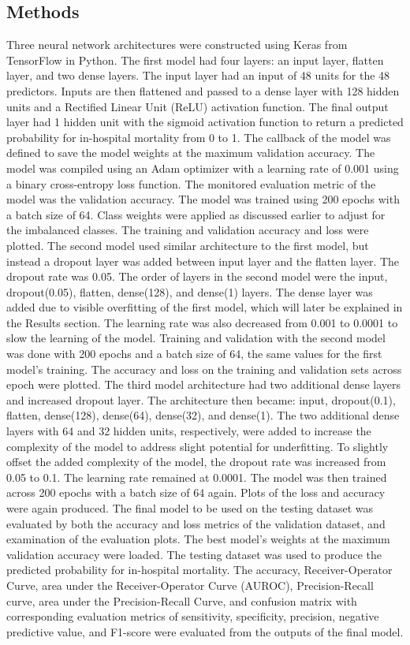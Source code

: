 \documentclass[10pt]{article}
\begin{document}
\begin{multicols}{2}
\section{Methods}
Three neural network architectures were constructed using Keras from TensorFlow in Python. The first model had four layers: an input layer, flatten layer, and two dense layers. The input layer had an input of 48 units for the 48 predictors. Inputs are then flattened and passed to a dense layer with 128 hidden units and a Rectified Linear Unit (ReLU) activation function. The final output layer had 1 hidden unit with the sigmoid activation function to return a predicted probability for in-hospital mortality from 0 to 1. The callback of the model was defined to save the model weights at the maximum validation accuracy. The model was compiled using an Adam optimizer with a learning rate of 0.001 using a binary cross-entropy loss function. The monitored evaluation metric of the model was the validation accuracy. The model was trained using 200 epochs with a batch size of 64. Class weights were applied as discussed earlier to adjust for the imbalanced classes. The training and validation accuracy and loss were plotted. The second model used similar architecture to the first model, but instead a dropout layer was added between input layer and the flatten layer. The dropout rate was 0.05. The order of layers in the second model were the input, dropout(0.05), flatten, dense(128), and dense(1) layers. The dense layer was added due to visible overfitting of the first model, which will later be explained in the Results section. The learning rate was also decreased from 0.001 to 0.0001 to slow the learning of the model. Training and validation with the second model was done with 200 epochs and a batch size of 64, the same values for the first model's training. The accuracy and loss on the training and validation sets across epoch were plotted. The third model architecture had two additional dense layers and increased dropout layer. The architecture then became: input, dropout(0.1), flatten, dense(128), dense(64), dense(32), and dense(1). The two additional dense layers with 64 and 32 hidden units, respectively, were added to increase the complexity of the model to address slight potential for underfitting. To slightly offset the added complexity of the model, the dropout rate was increased from 0.05 to 0.1. The learning rate remained at 0.0001. The model was then trained across 200 epochs with a batch size of 64 again. Plots of the loss and accuracy were again produced. The final model to be used on the testing dataset was evaluated by both the accuracy and loss metrics of the validation dataset, and examination of the evaluation plots. The best model's weights at the maximum validation accuracy were loaded. The testing dataset was used to produce the predicted probability for in-hospital mortality. The accuracy, Receiver-Operator Curve, area under the Receiver-Operator Curve (AUROC), Precision-Recall curve, area under the Precision-Recall Curve, and confusion matrix with corresponding evaluation metrics of sensitivity, specificity, precision, negative predictive value, and F1-score were evaluated from the outputs of the final model.


\end{multicols}
\end{document}

